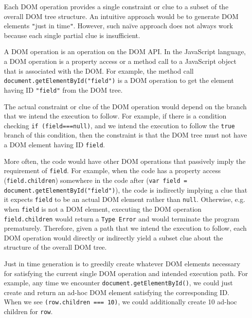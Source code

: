 Each DOM operation provides a single constraint or clue to a subset of the overall DOM tree structure.  An intuitive approach would be to generate DOM elements {\tt "}just in time{\tt "}.  
However, such na\"ive approach does not always work because each single partial clue is insufficient.  

A DOM operation is an operation on the DOM API.  In the JavaScript language, a DOM operation is a property access or a method call to a JavaScript object that is associated with the DOM.  
For example, the method call {\tt document.getElementById("field")} is a DOM operation to get the element having ID {\tt "field"} from the DOM tree.  

The actual constraint or clue of the DOM operation would depend on the branch that we intend the execution to follow.  
For example, if there is a condition checking {\tt if (field===null)}, and we intend the execution to follow the {\tt true} branch of this condition,  
then the constraint is that the DOM tree must not have a DOM element having ID {\tt field}.  

More often, the code would have other DOM operations that passively imply the requirement of {\tt field}.  
For example, when the code has a property access ({\tt field.children}) somewhere in the code after ({\tt var field = document.getElementById("field")}), 
the code is indirectly implying a clue that it expects {\tt field} to be an actual DOM element rather than {\tt null}.  
Otherwise, e.g. when {\tt field} is not a DOM element, executing the DOM operation {\tt field.children} would return a {\tt Type Error} and would terminate the program prematurely.    
Therefore, given a path that we intend the execution to follow, each DOM operation would directly or indirectly yield a subset clue about the structure of the overall DOM tree.  

Just in time generation is to greedily create whatever DOM elements necessary for satisfying the current single DOM operation and intended execution path.    
For example, any time we encounter {\tt document.getElementById()}, we could just create and return an ad-hoc DOM element satisfying the corresponding ID.  
When we see {\tt (row.children === 10)}, we could additionally create 10 ad-hoc children for {\tt row}.  


